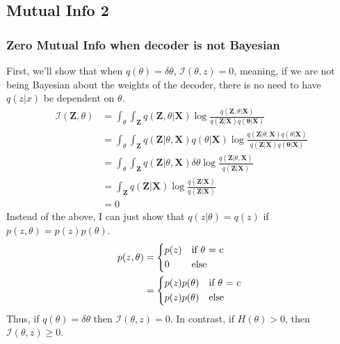 \documentclass{article}
\begin{document}
\subsection{Mutual Info 2}

\subsubsection{Zero Mutual Info when decoder is not Bayesian}

First, we'll show that when $q(\theta)=\delta \theta$, $\mathcal{I}(\theta,z)=0$, meaning, if we are not being Bayesian about the weights of the decoder, there is no need to have $q(z|x)$ be dependent on $\theta$.
\begin{align}
    \mathcal{I} (\mathbf{Z}, \theta) &= \int_{\theta} \int_{\mathbf{Z}} q(\mathbf{Z}, \theta |\mathbf{X}) \log \frac{q(\mathbf{Z}, \theta |\mathbf{X})} 
    {q(\mathbf{Z}|\mathbf{X}) q(\mathbf{\theta} | \mathbf{X})} \\
    &= \int_{\theta} \int_{\mathbf{Z}} q(\mathbf{Z}| \theta,\mathbf{X})q(\theta|\mathbf{X}) \log \frac{q(\mathbf{Z}| \theta,\mathbf{X})q(\theta|\mathbf{X})} 
    {q(\mathbf{Z}|\mathbf{X}) q(\mathbf{\theta} | \mathbf{X})} \\
    &= \int_{\theta} \int_{\mathbf{Z}} q(\mathbf{Z}| \theta,\mathbf{X}) \delta \theta \log \frac{q(\mathbf{Z}| \theta,\mathbf{X})} 
    {q(\mathbf{Z}|\mathbf{X})} \\
    &= \int_{\mathbf{Z}} q(\mathbf{Z}|\mathbf{X}) \log \frac{q(\mathbf{Z}|\mathbf{X})} 
    {q(\mathbf{Z}|\mathbf{X})} \\
    &= 0
\end{align}
Instead of the above, I can just show that $q(z|\theta)=q(z)$ if $p(z,\theta)=p(z)p(\theta)$.
\begin{align}
    p(z,\theta) &= 
        \begin{cases*}
            p(z) & if $\theta$ = c \\
            0 & else
        \end{cases*} \\
    &= 
        \begin{cases*}
            p(z)p(\theta) & if $\theta$ = c \\
            p(z)p(\theta) & else
        \end{cases*} 
\end{align}
Thus, if $q(\theta)=\delta \theta$ then $\mathcal{I}(\theta,z)=0$. In contrast, if $H(\theta)>0$, then $\mathcal{I}(\theta,z) \geq 0$.
\end{document}
